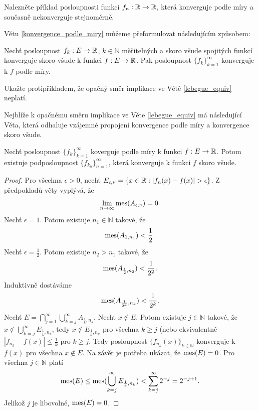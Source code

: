 \begin{uloha}
Nalezněte příklad posloupnosti funkcí $f_n:\mathbb{R} \to \mathbb{R}$, která konverguje podle míry a současně nekonverguje stejnoměrně.
\end{uloha}

Větu \ref{konvergence_podle_miry} m\r užeme přeformulovat následujícím zp\r usobem:
\begin{theorem}
Nechť posloupnost $f_k:E \to \mathbb{R}$, $k \in \mathbb{N}$ měřitelných a skoro všude spojitých funkcí konverguje skoro všude k funkci $f:E \to \mathbb{R}$.
Pak posloupnost $\{f_k\}_{k=1}^{\infty}$ konverguje k $f$ podle míry.
\label{lebegue_equiv}
\end{theorem}

\begin{uloha}
Ukažte protipříkladem, že opačný směr implikace ve Větě \ref{lebegue_equiv} neplatí.
\end{uloha}
Nejblíže k opačnému směru implikace ve Věte \ref{lebegue_equiv} má následující Věta, která odhaluje vzájemné propojení konvergence podle míry a konvergence skoro všude.

\begin{theorem}[Riesz]
Nechť posloupnost $\{f_k\}_{k=1}^{\infty}$ koverguje podle míry k funkci $f:E \to \mathbb{R}$. 
Potom existuje podposloupnost $\{f_{k_n}\}_{n=1}^{\infty}$, která konverguje k funkci $f$ skoro všude.
\label{v_1.17_Riesz}
\end{theorem}

\begin{proof}
Pro všechna $\epsilon>0$, nechť $E_{\epsilon, \nu}=\{x \in \R: |f_n(x)-f(x)|>\epsilon\}$. Z předpoklad\r u věty vyplývá, že 
\begin{align*}
\lim \limits _{n \to \infty} \operatorname{mes}(A_{\epsilon, \nu})=0.
\end{align*}
Nechť $\epsilon = 1$. Potom existuje $n_1 \in \mathbb{N}$ takové, že \begin{align*}
\operatorname{mes}(A_{1,n_1})<\frac{1}{2}.
\end{align*} 
Nechť $\epsilon = \frac{1}{2}$. Potom existuje $n_2>n_1$ takové, že 
\begin{align*}
\operatorname{mes}(A_{\frac{1}{2},n_2})<\frac{1}{2^2}.
\end{align*}
Induktivně dostáváme
\begin{align*}
\operatorname{mes}(A_{\frac{1}{2^k},n_k})<\frac{1}{2^k}.
\end{align*}
Nechť $E=\bigcap \limits _{j=1}^{\infty} \bigcup _{k=j}^{\infty}A_{\frac{1}{k},n_k}$. Nechť $x \notin E$. Potom existuje $j \in \mathbb{N}$ takové, že $x \notin \bigcup \limits _{k=j}^{\infty} E_{\frac{1}{k},n_k}$, tedy $x \notin E_{\frac{1}{k},n_k}$ pro všechna $k \geq j$ (nebo ekvivalentně $|f_{n_k} - f(x)|\leq \frac{1}{k}$ pro $k \geq j$. Tedy posloupnost $\{f_{n_k}(x)\}_{k \in \mathbb{N}}$ konverguje k $f(x)$ pro všechna $x \notin E$.
Na závěr je potřeba ukázat, že $\operatorname{mes}(E)=0$. Pro všechna $j \in \mathbb{N}$ platí
\begin{align*}
\operatorname{mes}(E) \leq \operatorname{mes}(\bigcup \limits _{k=j}^{\infty}E_{\frac{1}{k},n_k})< \sum \limits _{k=j}^{\infty}2^{-j}=2^{-j+1}.
\end{align*}
Jelikož $j$ je libovolné, $\operatorname{mes}(E)=0$.
\end{proof}


